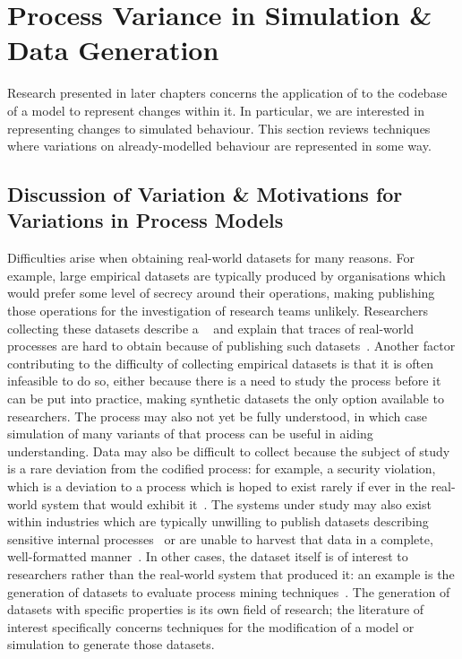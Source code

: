 \section{Process Variance in Simulation \& Data Generation}
\label{sec:dynamism_in_sm}
\label{subsec:variations_in_sm}


Research presented in later chapters concerns the application of \aop{} to the
codebase of a model to represent changes within it. In particular, we are
interested in representing changes to simulated behaviour. This section reviews
techniques where variations on already-modelled behaviour are represented in
some way.

\subsection{Discussion of Variation \& Motivations for Variations in Process Models}
\label{subsec:variation_sm_motivations}

Difficulties arise when obtaining real-world datasets for many reasons. For
example, large empirical datasets are typically produced by organisations which
would prefer some level of secrecy around their operations, making publishing
those operations for the investigation of research teams unlikely. Researchers
collecting these datasets describe a ~\cite{bpi_ten_years_of_datasets} and explain that traces of real-world
processes are hard to obtain because  of publishing such
datasets~\cite{bpi_ten_years_of_datasets}. Another factor contributing to the
difficulty of collecting empirical datasets is that it is often infeasible to do
so, either because there is a need to study the process before it can be put
into practice, making synthetic datasets the only option available to
researchers. The process may also not yet be fully understood, in which case
simulation of many variants of that process can be useful in aiding
understanding. Data may also be difficult to collect because the subject of
study is a rare deviation from the codified process: for example, a security
violation, which is a deviation to a process which is hoped to exist rarely if
ever in the real-world system that would exhibit it~\cite{stocker2013secsy}. The
systems under study may also exist within industries which are typically
unwilling to publish datasets describing sensitive internal
processes~\cite{bpi_ten_years_of_datasets} or are unable to harvest that data in
a complete, well-formatted manner~\cite{ingvaldsen2007preprocessing}. In other
cases, the dataset itself is of interest to researchers rather than the
real-world system that produced it: an example is the generation of datasets to
evaluate process mining techniques~\cite{van2004process,agrawal1998mining}. The
generation of datasets with specific properties is its own field of research;
the literature of interest specifically concerns techniques for the modification
of a model or simulation to generate those datasets.

